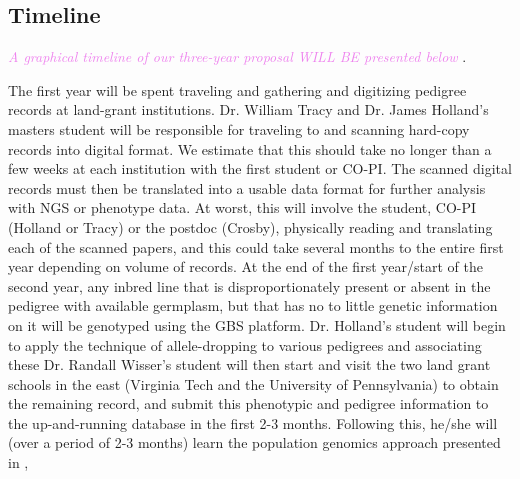 \documentclass[12pt]{article}
\newcommand{\kc}[1]{\textcolor{violet}{ \emph{\scriptsize  #1}} }
\begin{document}
\subsection*{Timeline}
\kc{A graphical timeline of our three-year proposal WILL BE presented below}. 

The first year will be spent traveling and gathering and digitizing pedigree records at land-grant institutions.
Dr. William Tracy and Dr. James Holland's masters student will be responsible for traveling to and scanning hard-copy records into digital format.  We estimate that this should take no longer than a few weeks at each institution with the first student or CO-PI. 
The scanned digital records must then be translated into a usable data format for further analysis with NGS or phenotype data. At worst, this will involve the student, CO-PI (Holland or Tracy) or the postdoc (Crosby), physically reading and translating each of the scanned papers, and this could take several months to the entire first year depending on volume of records. 
At the end of the first year/start of the second year, any inbred line that is disproportionately present or absent in the pedigree with available germplasm, but that has no to little genetic information on it will be genotyped using the GBS platform. 
Dr. Holland's student will begin to apply the technique of allele-dropping to various pedigrees and associating these
Dr. Randall Wisser's student will then start and visit the two land grant schools in the east (Virginia Tech and the University of Pennsylvania) to obtain the remaining record, and submit this phenotypic and pedigree information to the up-and-running database in the first 2-3 months. Following this, he/she will (over a period of 2-3 months) learn the population genomics approach presented in \citep{Berg:2014bs},


\newpage

\end{document}
